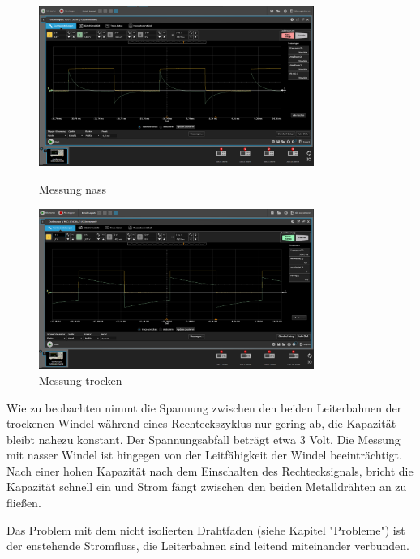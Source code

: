 \begin{figure}[ht]
	\begin{minipage}[ht]{0.45\linewidth}
		\centering
		\includegraphics[width=0.8\textwidth]{includes/kom/graphics/MessungWindelnass_1Ohm_2_2u}
		\caption{Messung nass}
		\label{fig:cap_sensor_wet}
	\end{minipage}
	\begin{minipage}[ht]{0.45\linewidth}
		\centering
		\includegraphics[width=0.8\textwidth]{includes/kom/graphics/MessungWindel_1Ohm_2_2u}
		\caption{Messung trocken}
		\label{fig:cap_sensor_dry}
	\end{minipage}
\end{figure}

Wie zu beobachten nimmt die Spannung zwischen den beiden Leiterbahnen der trockenen Windel während eines Rechteckszyklus nur gering ab, die Kapazität bleibt nahezu konstant. Der Spannungsabfall beträgt etwa 3 Volt. Die Messung mit nasser Windel ist hingegen von der Leitfähigkeit der Windel beeinträchtigt. Nach einer hohen Kapazität nach dem Einschalten des Rechtecksignals, bricht die Kapazität schnell ein und Strom fängt zwischen den beiden Metalldrähten an zu fließen. 

Das Problem mit dem nicht isolierten Drahtfaden (siehe Kapitel "Probleme") ist der enstehende Stromfluss, die Leiterbahnen sind leitend miteinander verbunden.

